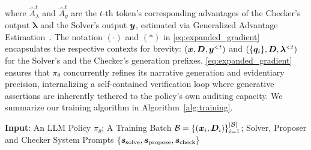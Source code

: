 \documentclass[10pt, a4paper, logo]{googledeepmind} %
\begin{document}
where $\hat{A}_\lambda^t$  and  $\hat{A}_y^t$ are the $t$-th token's corresponding advantages of the Checker's output $\bm{\lambda}$ and the Solver's output ${\bm{y}}$, estimated via Generalized Advantage Estimation~\citep{schulman2015high}. The notation $(\cdot)$ and $(*)$ in \eqref{eq:expanded_gradient} encapsulates the respective contexts for brevity: $({\bm{x}}, {\bm{D}}, {\bm{y}}^{<t})$ and $(\{{\bm{q}}_i\}, {\bm{D}}, \bm{\lambda}^{<t})$ for the Solver's and the Checker's generation prefixes. \eqref{eq:expanded_gradient} ensures that $\pi_\theta$ concurrently refines its narrative generation and evidentiary precision, internalizing a self-contained verification loop where generative assertions are inherently tethered to the policy's own auditing capacity. We summarize our training algorithm in Algorithm~\ref{alg:training}.

\begin{algorithm*}[!t]
\textbf{Input}: An LLM Policy $\pi_\theta$; A Training Batch $\mathcal{B}=\{({\bm{x}}_i,{\bm{D}}_i)\}_{i=1}^{|\mathcal{B}|}$; Solver, Proposer and Checker System Prompts $\{{\bm{s}}_{\text{solve}}, {\bm{s}}_{\text{propose}}, {\bm{s}}_{\text{check}}\}$\;


\end{algorithm*}
\end{document}
